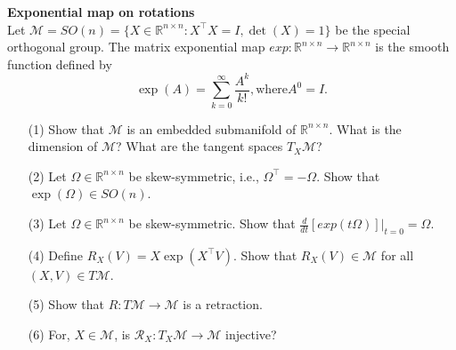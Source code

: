 \documentclass[en, oneside]{assignment}
\begin{document}
\begin{prob} \textbf{Exponential map on rotations}\\
    Let $\mathcal{M} = SO(n) = \{X \in \mathbb{R}^{n \times n}: X^\top X = I, \det(X) = 1\}$ be the special orthogonal group.
    The matrix exponential map $exp: \mathbb{R}^{n \times n} \to \mathbb{R}^{n \times n}$ is the smooth function defined by
    \begin{equation*}
        \exp(A) = \sum_{k=0}^\infty \frac{A^k}{k!}, \text{where} A^0 = I.
    \end{equation*}
    \begin{itemize}
        \item[(1)] Show that $\mathcal{M}$ is an embedded submanifold of $\mathbb{R}^{n \times n}$. 
        What is the dimension of $\mathcal{M}$? What are the tangent spaces $T_X\mathcal{M}$?
        \item[(2)] Let $\Omega \in \mathbb{R}^{n \times n}$ be skew-symmetric, i.e., $\Omega^\top = -\Omega$. 
        Show that $\exp(\Omega) \in SO(n)$.
        \item[(3)] Let $\Omega \in \mathbb{R}^{n \times n}$ be skew-symmetric. Show that $\frac{d}{dt}[exp(t\Omega)]|_{t=0} = \Omega$.
        \item[(4)] Define $R_X(V) = X \exp(X^\top V)$. Show that $R_X(V) \in \mathcal{M}$ for all $(X, V) \in T\mathcal{M}$.
        \item[(5)] Show that $R: T\mathcal{M} \to \mathcal{M}$ is a retraction.
        \item[(6)] For, $X \in \mathcal{M}$, is $\mathcal{R}_X: T_X\mathcal{M} \to \mathcal{M}$ injective?
    \end{itemize}
\end{prob}
\end{document}
